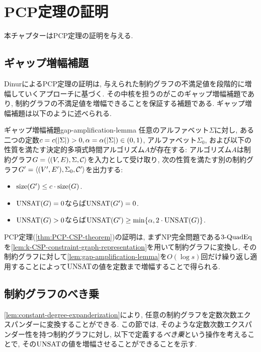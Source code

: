 \chapter{PCP定理の証明} \label{chap:PCP-proof}

本チャプターはPCP定理の証明を与える.

\section{ギャップ増幅補題}
DinurによるPCP定理の証明は, 与えられた制約グラフの不満足値を段階的に増幅していくアプローチに基づく.
その中核を担うのがこのギャップ増幅補題であり, 制約グラフの不満足値を増幅できることを保証する補題である.
ギャップ増幅補題は以下のように述べられる.

\begin{lemma}{ギャップ増幅補題}{gap-amplification-lemma}
  任意のアルファベット$\Sigma$に対し, ある二つの定数$c=c(\abs{\Sigma})>0,\alpha=\alpha(\abs{\Sigma})\in (0,1)$, アルファベット$\Sigma_0$, および以下の性質を満たす決定的多項式時間アルゴリズム$A$が存在する: 
  アルゴリズム$A$は制約グラフ$G=\langle(V,E),\Sigma,\mathcal{C}\rangle$を入力として受け取り, 次の性質を満たす別の制約グラフ$G'=\langle(V',E'),\Sigma_0,\mathcal{C}'\rangle$を出力する:
  \begin{itemize}
    \item $\mathrm{size}(G')\le c\cdot \mathrm{size}(G)$.
    \item $\mathrm{UNSAT}(G)=0$ならば$\mathrm{UNSAT}(G')=0$.
    \item $\mathrm{UNSAT}(G)>0$ならば$\mathrm{UNSAT}(G')\ge \min\{\alpha, 2\cdot \mathrm{UNSAT}(G)\}$.
  \end{itemize}
\end{lemma}

PCP定理(\cref{thm:PCP-CSP-theorem})の証明は, 
まずNP完全問題である$\text{3-QuadEq}$を\cref{lem:k-CSP-constraint-graph-representation}を用いて制約グラフに変換し, その制約グラフに対して\cref{lem:gap-amplification-lemma}を$O(\log s)$回だけ繰り返し適用することによって$\mathrm{UNSAT}$の値を定数まで増幅することで得られる.


\section{制約グラフのべき乗}

\cref{lem:constant-degree-expanderization}により, 任意の制約グラフを定数次数エクスパンダーに変換することができる.
この節では, そのような定数次数エクスパンダー性を持つ制約グラフに対し, 以下で定義する\emph{べき乗}という操作を考えることで, その$\mathrm{UNSAT}$の値を増幅させることができることを示す.

